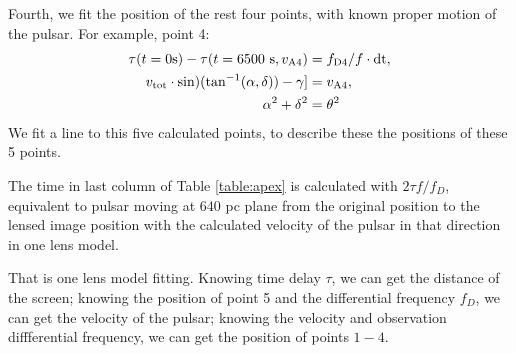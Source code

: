 \documentclass[useAMS,usenatbib]{mn2e}
\begin{document}
Fourth, we fit the position of the rest four points, with known proper motion of the pulsar. For example, point 4:
\begin{align*}
\tau(t=0 {\rm s}) -\tau(t=6500~{\rm s}, v_{\rm A4}) &= f_{\rm D4} /f\cdot{\rm dt},\\
v_{\rm tot}\cdot {\rm sin)( tan^{-1}(\alpha,\delta))-\gamma]} &=v_{\rm A4},\\
{\alpha}^2+{\delta}^2 &= {\theta}^2
\end{align*}
We fit a line to this five calculated points, to describe these the positions of these 5 points. 

The time in last column of Table \ref{table:apex} is calculated with $2{\tau}f/{f_{D}}$,
equivalent to pulsar moving at $640$ pc plane from the
original position to the lensed image position with the calculated velocity of the pulsar in that direction in one lens model.


That is one lens model fitting. Knowing time delay ${\tau}$, we can get the distance of the screen; knowing the position of point 5 and the differential frequency ${f_D}$, we can get the velocity of the pulsar; knowing the velocity and observation diffferential frequency, we can get the position of points $1-4$. %
\end{document}
